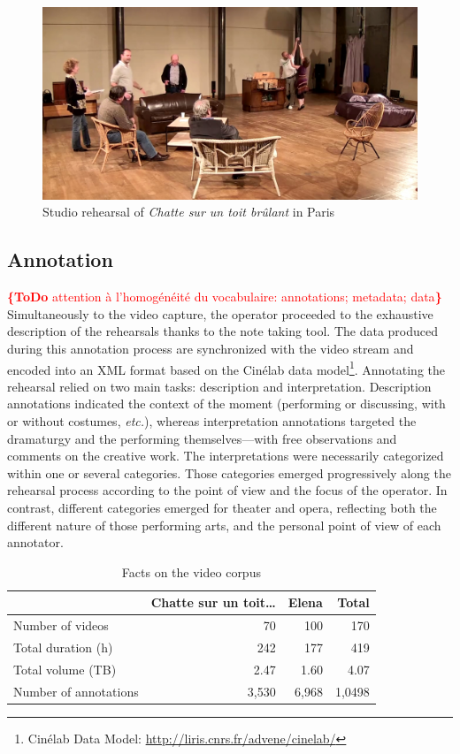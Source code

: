 \documentclass[conference]{IEEEtran}
\newcommand{\todo}[1]{\noindent\textcolor{red}{{\bf \{ToDo} #1{\bf \}}}}
\begin{document}
\begin{figure}[htb!]
  \centering
  \includegraphics[width=\columnwidth]{onstudio}
  \caption{Studio rehearsal of \emph{Chatte sur un toit brûlant} in Paris}
  \label{fig:onstudio}
\end{figure}

\subsection{Annotation}
\todo{attention à l'homogénéité du vocabulaire: annotations; metadata; data}
Simultaneously to the video capture, the operator proceeded to the exhaustive description of the rehearsals thanks to the note taking tool. The data produced during this annotation process are synchronized with the video stream and encoded into an XML format based on the Cinélab data model\footnote{Cinélab Data Model: \url{http://liris.cnrs.fr/advene/cinelab/}}.
Annotating the rehearsal relied on two main tasks: description and interpretation.  Description annotations indicated the context of the moment (performing or discussing, with or without costumes, \emph{etc.}), whereas interpretation annotations targeted the dramaturgy and the performing themselves---with free observations and comments on the creative work. The interpretations were necessarily categorized within one or several categories. Those categories emerged progressively along the rehearsal process according to the point of view and the focus of the operator. 
In contrast, different categories emerged for theater and opera, reflecting both the different nature of those performing arts, and the personal point of view of each annotator.

\begin{table}
\centering
{\small
\begin{tabular}{|l|r|r|r|}
\hline 
  & Chatte sur un toit\ldots & Elena & Total \\ 
\hline 
Number of videos & 70 & 100 & 170 \\ 
\hline 
Total duration (h) & 242 & 177 & 419 \\ 
\hline 
Total volume (TB) & 2.47 & 1.60 & 4.07 \\ 
\hline 
Number of annotations & 3,530 & 6,968 & 1,0498\\ 
\hline
\end{tabular} 
}
\caption{Facts on the video corpus}
\label{table_facts}
\end{table}
\end{document}
